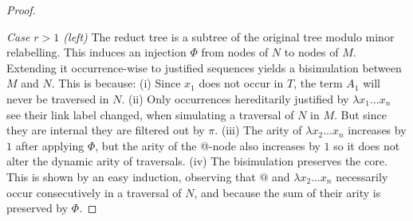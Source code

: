 \documentclass{elsarticle}
\theoremstyle{plain}
\theoremstyle{definition}
\def\coresymbol{\pi} %
\begin{document}
\begin{proof}
\begin{center}
            \end{center}
\fi
\noindent
\emph{Case $r>1$ (left)} The reduct tree is a subtree of the original tree modulo minor relabelling.
This induces an injection $\Phi$ from nodes of $N$ to nodes of $M$.
Extending it occurrence-wise to justified sequences
yields a bisimulation between $M$ and $N$.
This is because:
%
(i) Since $x_1$ does not occur in $T$, the term $A_1$ will never be traversed in $N$.
%
(ii) Only occurrences hereditarily justified by $\lambda x_1 \ldots x_n$ see their link label changed, when simulating a traversal of $N$ in $M$. But since they are internal they are filtered out by $\coresymbol$.
%
(iii) The arity of $\lambda x_2 \ldots x_n$ increases by $1$ after applying $\Phi$, but the arity of the @-node also increases by $1$ so it does
not alter the dynamic arity of traversals.
%
(iv) The bisimulation preserves the core. This is shown by an easy induction, observing that $@$ and $\lambda x_2\ldots x_n$ necessarily occur consecutively in a traversal of $N$, and because the sum of their arity is preserved by $\Phi$.


\end{proof}
\end{document}
